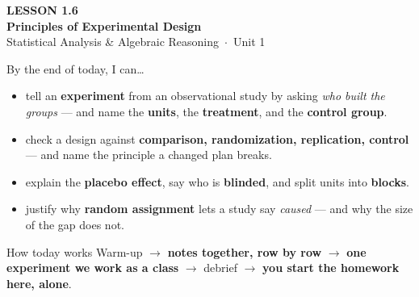 \documentclass[aspectratio=169, 11pt]{beamer}
\begin{document}
{
\begin{frame}[plain]
  \vspace{2.8cm}\hspace{0.55cm}%
  \begin{minipage}{0.9\textwidth}
    {\color{goldacc}\bfseries\small LESSON 1.6}\\[0.5cm]
    {\color{white}\bfseries\LARGE Principles of Experimental Design}\\[1.2cm]
    {\color{frostmid}\small Statistical Analysis \& Algebraic Reasoning~$\cdot$~Unit 1}
  \end{minipage}
\end{frame}
}

\begin{frame}[t, plain]
  By the end of today, I can\ldots
  \begin{itemize}\setlength{\itemsep}{5pt}
    \item tell an \textbf{experiment} from an observational study by asking \emph{who built
          the groups} --- and name the \textbf{units}, the \textbf{treatment}, and the
          \textbf{control group}.
    \item check a design against \textbf{comparison, randomization, replication, control} ---
          and name the principle a changed plan breaks.
    \item explain the \textbf{placebo effect}, say who is \textbf{blinded}, and split units
          into \textbf{blocks}.
    \item justify why \textbf{random assignment} lets a study say \emph{caused} --- and why
          the size of the gap does not.
  \end{itemize}
  \begin{block}{How today works}
    Warm-up $\to$ \textbf{notes together, row by row} $\to$ \textbf{one experiment we work as
    a class} $\to$ debrief $\to$ \textbf{you start the homework here, alone}.
  \end{block}
\end{frame}
\end{document}

